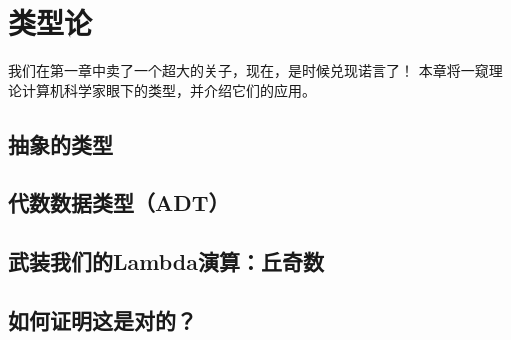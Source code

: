 \documentclass[../main.tex]{subfiles}
\begin{document}
  \section{类型论}
  \indent 我们在第一章中卖了一个超大的关子，现在，是时候兑现诺言了！
  本章将一窥理论计算机科学家眼下的类型，并介绍它们的应用。

  \subsection{抽象的类型}

  \subsection{代数数据类型（ADT）}

  \subsection{武装我们的Lambda演算：丘奇数}

  \subsection{如何证明这是对的？}

  \begin{thebibliography}{1}
    
  \end{thebibliography}
\end{document}
